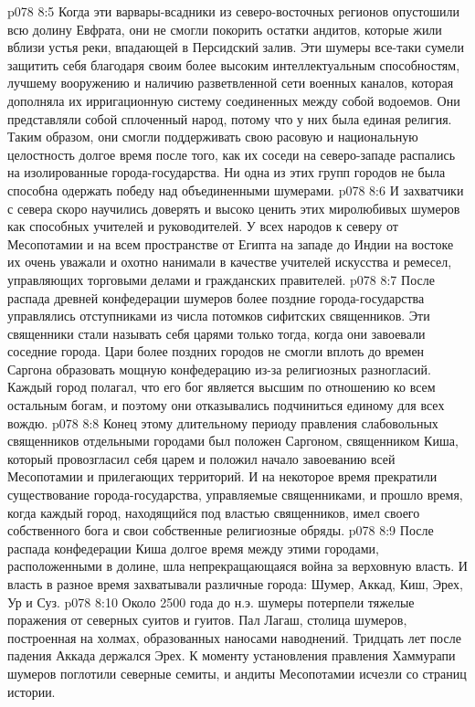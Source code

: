 \vs p078 8:5 Когда эти варвары\hyp{}всадники из северо\hyp{}восточных регионов опустошили всю долину Евфрата, они не смогли покорить остатки андитов, которые жили вблизи устья реки, впадающей в Персидский залив. Эти шумеры все\hyp{}таки сумели защитить себя благодаря своим более высоким интеллектуальным способностям, лучшему вооружению и наличию разветвленной сети военных каналов, которая дополняла их ирригационную систему соединенных между собой водоемов. Они представляли собой сплоченный народ, потому что у них была единая религия. Таким образом, они смогли поддерживать свою расовую и национальную целостность долгое время после того, как их соседи на северо\hyp{}западе распались на изолированные города\hyp{}государства. Ни одна из этих групп городов не была способна одержать победу над объединенными шумерами.
\vs p078 8:6 И захватчики с севера скоро научились доверять и высоко ценить этих миролюбивых шумеров как способных учителей и руководителей. У всех народов к северу от Месопотамии и на всем пространстве от Египта на западе до Индии на востоке их очень уважали и охотно нанимали в качестве учителей искусства и ремесел, управляющих торговыми делами и гражданских правителей.
\vs p078 8:7 После распада древней конфедерации шумеров более поздние города\hyp{}государства управлялись отступниками из числа потомков сифитских священников. Эти священники стали называть себя царями только тогда, когда они завоевали соседние города. Цари более поздних городов не смогли вплоть до времен Саргона образовать мощную конфедерацию из\hyp{}за религиозных разногласий. Каждый город полагал, что его бог является высшим по отношению ко всем остальным богам, и поэтому они отказывались подчиниться единому для всех вождю.
\vs p078 8:8 Конец этому длительному периоду правления слабовольных священников отдельными городами был положен Саргоном, священником Киша, который провозгласил себя царем и положил начало завоеванию всей Месопотамии и прилегающих территорий. И на некоторое время прекратили существование города\hyp{}государства, управляемые священниками, и прошло время, когда каждый город, находящийся под властью священников, имел своего собственного бога и свои собственные религиозные обряды.
\vs p078 8:9 После распада конфедерации Киша долгое время между этими городами, расположенными в долине, шла непрекращающаяся война за верховную власть. И власть в разное время захватывали различные города: Шумер, Аккад, Киш, Эрех, Ур и Суз.
\vs p078 8:10 Около 2500 года до н.э. шумеры потерпели тяжелые поражения от северных суитов и гуитов. Пал Лагаш, столица шумеров, построенная на холмах, образованных наносами наводнений. Тридцать лет после падения Аккада держался Эрех. К моменту установления правления Хаммурапи шумеров поглотили северные семиты, и андиты Месопотамии исчезли со страниц истории.
